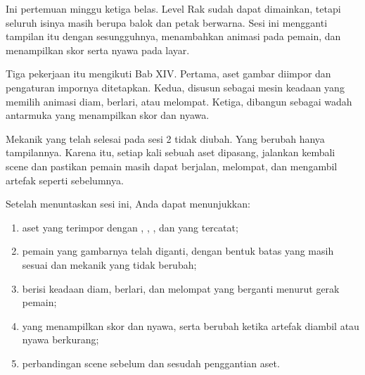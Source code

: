 

Ini pertemuan minggu ketiga belas. Level Rak sudah dapat dimainkan, tetapi
seluruh isinya masih berupa balok dan petak berwarna. Sesi ini mengganti
tampilan itu dengan  sesungguhnya, menambahkan animasi pada
pemain, dan menampilkan skor serta nyawa pada layar.

Tiga pekerjaan itu mengikuti Bab XIV. Pertama, aset gambar diimpor dan
pengaturan impornya ditetapkan. Kedua,  disusun sebagai mesin
keadaan yang memilih animasi diam, berlari, atau melompat. Ketiga,
 dibangun sebagai wadah antarmuka yang menampilkan skor dan
nyawa.

Mekanik yang telah selesai pada sesi 2 tidak diubah. Yang berubah hanya
tampilannya. Karena itu, setiap kali sebuah aset dipasang, jalankan kembali
scene dan pastikan pemain masih dapat berjalan, melompat, dan mengambil
artefak seperti sebelumnya.


\begin{tujuanbox}
Setelah menuntaskan sesi ini, Anda dapat menunjukkan:
\begin{enumerate}[leftmargin=1.5em, itemsep=0.2em]
  \item aset  yang terimpor dengan ,
        , , dan 
        yang tercatat;
  \item pemain yang gambarnya telah diganti, dengan bentuk batas yang masih
        sesuai dan mekanik yang tidak berubah;
  \item {} berisi keadaan diam, berlari, dan melompat yang
        berganti menurut gerak pemain;
  \item {} yang menampilkan skor dan nyawa, serta berubah ketika
        artefak diambil atau nyawa berkurang;
  \item perbandingan scene sebelum dan sesudah penggantian aset.
\end{enumerate}
\end{tujuanbox}


